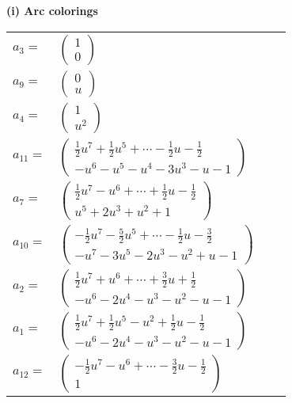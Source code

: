 \documentclass[1p]{elsarticle_modified}
\theoremstyle{definition}
\begin{document}
\flushleft \textbf{(i) Arc colorings}\\
\begin{tabular}{m{7pt} m{180pt} m{7pt} m{180pt} }
\flushright $a_{3}=$&$\begin{pmatrix}1\\0\end{pmatrix}$ \\
\flushright $a_{9}=$&$\begin{pmatrix}0\\u\end{pmatrix}$ \\
\flushright $a_{4}=$&$\begin{pmatrix}1\\u^2\end{pmatrix}$ \\
\flushright $a_{11}=$&$\begin{pmatrix}\frac{1}{2} u^7+\frac{1}{2} u^5+\cdots-\frac{1}{2} u-\frac{1}{2}\\- u^6- u^5- u^4-3 u^3- u-1\end{pmatrix}$ \\
\flushright $a_{7}=$&$\begin{pmatrix}\frac{1}{2} u^7- u^6+\cdots+\frac{1}{2} u-\frac{1}{2}\\u^5+2 u^3+u^2+1\end{pmatrix}$ \\
\flushright $a_{10}=$&$\begin{pmatrix}-\frac{1}{2} u^7-\frac{5}{2} u^5+\cdots-\frac{1}{2} u-\frac{3}{2}\\- u^7-3 u^5-2 u^3- u^2+u-1\end{pmatrix}$ \\
\flushright $a_{2}=$&$\begin{pmatrix}\frac{1}{2} u^7+u^6+\cdots+\frac{3}{2} u+\frac{1}{2}\\- u^6-2 u^4- u^3- u^2- u-1\end{pmatrix}$ \\
\flushright $a_{1}=$&$\begin{pmatrix}\frac{1}{2} u^7+\frac{1}{2} u^5- u^2+\frac{1}{2} u-\frac{1}{2}\\- u^6-2 u^4- u^3- u^2- u-1\end{pmatrix}$ \\
\flushright $a_{12}=$&$\begin{pmatrix}-\frac{1}{2} u^7- u^6+\cdots-\frac{3}{2} u-\frac{1}{2}\\1\end{pmatrix}$ \\

\end{tabular}
\end{document}
